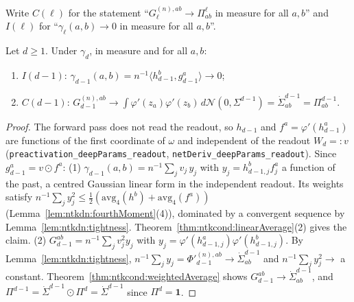 Write $C(\ell)$ for the statement ``$G_\ell^{(n),ab}\to\Pi^\ell_{ab}$ in measure for all $a,b$'' and $I(\ell)$ for ``$\gamma_\ell(a,b)\to0$ in measure for all $a,b$''.

\begin{theorem}\label{thm:ntkdn:top}
  \leanok
Let $d\ge1$. Under $\gamma_d$, in measure and for all $a,b$:
\begin{enumerate}
  \item $I(d-1)$: $\gamma_{d-1}(a,b)=n^{-1}\langle h_{d-1}^b,g_{d-1}^a\rangle\to0$;
  \item $C(d-1)$: $G_{d-1}^{(n),ab}\to\int\varphi'(z_a)\varphi'(z_b)\,d\mathcal N(0,\Sigma^{d-1})=\dot\Sigma^{d-1}_{ab}=\Pi^{d-1}_{ab}$.
\end{enumerate}
\end{theorem}

\begin{proof}
  \leanok
The forward pass does not read the readout, so $h_{d-1}$ and $f^a=\varphi'(h_{d-1}^a)$ are functions of the first coordinate of $\omega$ and independent of the readout $W_d=:v$ (\texttt{preactivation\_deepParams\_readout}, \texttt{netDeriv\_deepParams\_readout}). Since $g_{d-1}^a=v\odot f^a$:
(1) $\gamma_{d-1}(a,b)=n^{-1}\sum_jv_j\,y_j$ with $y_j=h^b_{d-1,j}f^a_j$ a function of the past, a centred Gaussian linear form in the independent readout. Its weights satisfy $n^{-1}\sum_jy_j^2\le\frac12(\mathrm{avg}_4(h^b)+\mathrm{avg}_4(f^a))$ (Lemma~\ref{lem:ntkdn:fourthMoment}(4)), dominated by a convergent sequence by Lemma~\ref{lem:ntkdn:tightness}. Theorem~\ref{thm:ntkcond:linearAverage}(2) gives the claim.
(2) $G_{d-1}^{ab}=n^{-1}\sum_jv_j^2y_j$ with $y_j=\varphi'(h^a_{d-1,j})\varphi'(h^b_{d-1,j})$. By Lemma~\ref{lem:ntkdn:tightness}, $n^{-1}\sum_jy_j=\Phi'^{(n),ab}_{d-1}\to\dot\Sigma^{d-1}_{ab}$ and $n^{-1}\sum_jy_j^2\to$ a constant. Theorem~\ref{thm:ntkcond:weightedAverage} shows $G_{d-1}^{ab}\to\dot\Sigma^{d-1}_{ab}$, and $\Pi^{d-1}=\dot\Sigma^{d-1}\odot\Pi^d=\dot\Sigma^{d-1}$ since $\Pi^d=\mathbf 1$.
\end{proof}

